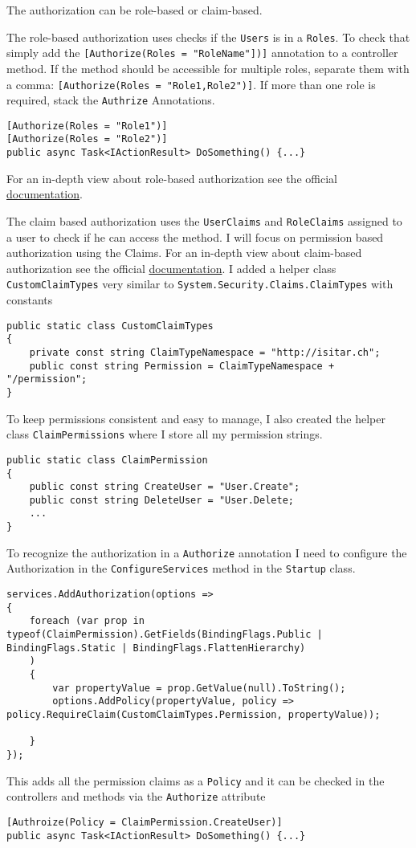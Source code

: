 \documentclass[12pt, a4paper]{article}
\begin{document}
The authorization can be role-based or claim-based. 

The role-based authorization uses checks if the \lstinline|Users| is in a \lstinline|Roles|. To check that simply add the \lstinline|[Authorize(Roles = "RoleName"])]| annotation to a controller method. If the method should be accessible for multiple roles, separate them with a comma: \lstinline|[Authorize(Roles = "Role1,Role2")]|. If more than one role is required, stack the \lstinline|Authrize| Annotations.
\begin{lstlisting}
[Authorize(Roles = "Role1")]
[Authorize(Roles = "Role2")]
public async Task<IActionResult> DoSomething() {...}
\end{lstlisting}
 For an in-depth view about role-based authorization see the official  \href{https://docs.microsoft.com/en-us/aspnet/core/security/authorization/roles}{documentation}.
 
The claim based authorization uses the \lstinline|UserClaims| and \lstinline|RoleClaims| assigned to a user to check if he can access the method.  I will focus on permission based authorization using the Claims. For an in-depth view about claim-based authorization see the official  \href{https://docs.microsoft.com/en-us/aspnet/core/security/authorization/claims}{documentation}.
I added a helper class \lstinline|CustomClaimTypes| very similar to \lstinline|System.Security.Claims.ClaimTypes| with constants
\begin{lstlisting}
public static class CustomClaimTypes
{
	private const string ClaimTypeNamespace = "http://isitar.ch";
	public const string Permission = ClaimTypeNamespace + "/permission";
}
\end{lstlisting}
To keep permissions consistent and easy to manage, I also created the helper class \lstinline|ClaimPermissions| where I store all my permission strings.
\begin{lstlisting}
public static class ClaimPermission
{
	public const string CreateUser = "User.Create";
	public const string DeleteUser = "User.Delete;
	...
}
\end{lstlisting}
To recognize the authorization in a \lstinline|Authorize| annotation I need to configure the Authorization in the \lstinline|ConfigureServices| method in the \lstinline|Startup| class.
\begin{lstlisting}
services.AddAuthorization(options =>
{
	foreach (var prop in typeof(ClaimPermission).GetFields(BindingFlags.Public | BindingFlags.Static | BindingFlags.FlattenHierarchy)
	)
	{
		var propertyValue = prop.GetValue(null).ToString();
		options.AddPolicy(propertyValue, policy => policy.RequireClaim(CustomClaimTypes.Permission, propertyValue));

	}
});
\end{lstlisting}
This adds all the permission claims as a \lstinline|Policy| and it can be checked in the controllers and methods via the \lstinline|Authorize| attribute
\begin{lstlisting}
[Authroize(Policy = ClaimPermission.CreateUser)]
public async Task<IActionResult> DoSomething() {...}
\end{lstlisting}
\end{document}
